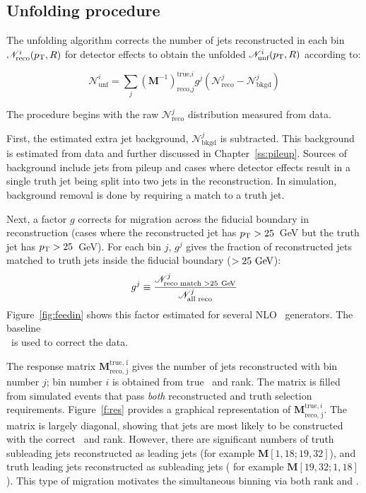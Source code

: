 \subsection{Unfolding procedure}
\label{ss:unfproc}
The unfolding algorithm corrects the number of jets reconstructed in each bin ${\mathscr N}^i_{\textrm {reco} }(p_{\text{T}},R)$ for detector effects to obtain the unfolded ${\mathscr N}^i_{\textrm{unf} }(p_{\text{T}},R)$ according to:

\begin{equation}
{\mathscr N}^i_{\textrm {unf}}= \sum_j \left ({\mathbf M}^{-1} \right )_{\textrm{reco,} j}^{\textrm{true,} i} g^j \left ({\mathscr N}^j_{\textrm {reco}}-{\mathscr N}^j_{\textrm{bkgd}}\right )
\label{eqn:unf}
\end{equation}

\noindent
The procedure begins with the raw ${\mathscr N}^j_{\textrm {reco}}$ distribution measured from data. 

First, the estimated extra jet background, ${\mathscr N}^j_{\textrm{bkgd}}$ is subtracted. This background is estimated from data and further discussed in Chapter~\ref{ss:pileup}. Sources of background  include jets from pileup and cases where
detector effects result in a single truth jet being split into 
two jets in the reconstruction. In simulation, background removal is done by requiring a match to a truth jet. 

Next, a factor $g$ corrects for migration across the fiducial boundary in reconstruction (cases where the reconstructed jet has
$p_{\text{T}}>25$~GeV but the truth jet has $p_{\text{T}}>25$~GeV). For each bin $j$, $g^j$ gives the fraction of reconstructed jets matched to truth jets inside the fiducial boundary ($>25 \gev$):
\begin{displaymath}
g^j \equiv \frac{{\mathscr N}^j_{\textrm {reco match }> 25 \gev}} {{\mathscr N}^j_{\textrm {all reco}}}
\label{eqn:feedin}
\end{displaymath}
Figure~\ref{fig:feedin} shows this factor estimated for several NLO \ttbar\ generators. The baseline \\
\powpy\ is used to correct the data.

The response matrix ${\mathbf M}_{\textrm{reco, j}}^{\textrm{true, i}}$ gives the number of jets reconstructed with bin number $j$; bin number $i$ is obtained from true \pt\ and rank.
The matrix is 
filled from simulated events that pass \textit{ both} reconstructed and truth selection requirements.
Figure~\ref{f:res} provides a graphical representation of ${\mathbf M}_{\textrm{reco, j}}^{\textrm{true}, i}$. 
The matrix is largely diagonal, showing that jets are most likely to be constructed with the correct \pt\ and rank.
However, there are significant numbers of truth subleading jets reconstructed as leading jets (for example ${\mathbf M}[1,18; 19,32]$), and 
truth leading jets reconstructed as subleading jets ( for example ${\mathbf M}[19,32;1,18]$). This type of migration motivates the simultaneous binning via both rank and \pt.



